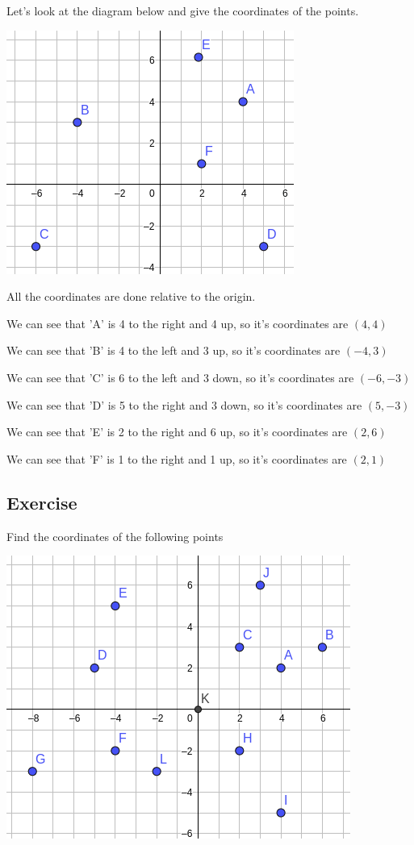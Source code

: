 \begin{exmp}
Let's look at the diagram below and give the coordinates of the points.
\begin{center}
\includegraphics[scale=0.5]{./Images/Transformations/Coord_eg_1.png}
\end{center}
All the coordinates are done relative to the origin.

We can see that 'A' is 4 to the right and 4 up, so it's coordinates are $(4, 4)$

We can see that 'B' is 4 to the left and 3 up, so it's coordinates are $(-4, 3)$

We can see that 'C' is 6 to the left and 3 down, so it's coordinates are $(-6, -3)$

We can see that 'D' is 5 to the right and 3 down, so it's coordinates are $(5, -3)$

We can see that 'E' is 2 to the right and 6 up, so it's coordinates are $(2, 6)$

We can see that 'F' is 1 to the right and 1 up, so it's coordinates are $(2, 1)$
\end{exmp}
\subsection{Exercise}
Find the coordinates of the following points
\begin{center}
\includegraphics[scale=0.5]{./Images/Transformations/Coords_Ex_1.png}
\end{center}

